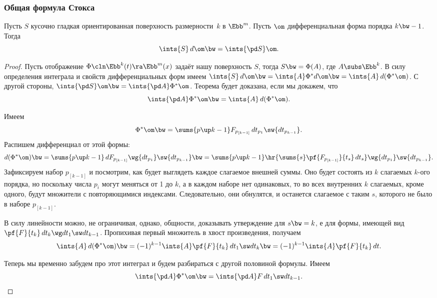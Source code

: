 \documentclass[a4paper]{article}
\newcommand{\pv}[1]{{p_{[#1]}}}
\newcommand{\di}[3]{{d {#1}_{#2_{#3}}}}
\begin{document}
\subsubsection{Общая формула Стокса}

\begin{theorem}
Пусть $S$ кусочно гладкая ориентированная поверхность размерности~$k$ в $\Ebb^m$. Пусть $\om$ дифференциальная форма
порядка $k\bw-1$. Тогда
$$\ints{S}\,d \om \bw= \ints{\pd S} \om.$$
\end{theorem}
\begin{proof}
Пусть отображение $\Phi\cln \Ebb^k(t) \ra \Ebb^m(x)$ задаёт нашу поверхность $S$, тогда $S \bw= \Phi(A)$, где
$A \subs \Ebb^k$. В силу определения интеграла и свойств дифференциальных форм имеем $\ints{S}\,d \om \bw=
\ints{A}\Phi^*d \om \bw= \ints{A}\,d(\Phi^*\om)$. С другой стороны, $\ints{\pd S}\om \bw= \ints{\pd A}
\Phi^*\om$. Теорема будет доказана, если мы докажем, что
$$\ints{\pd A} \Phi^*\om \bw= \ints{A}\,d(\Phi^*\om).$$

Имеем
$$\Phi^*\om \bw= \sums{p\up k-1} F_{\pv{k-1}} \,\di tp1\sw \di tp{k-1}.$$
Распишем дифференциал от этой формы:
$$
d(\Phi^*\om) \bw= \sums{p\up k-1} \,d F_{\pv{k-1}} \wg \di tp1\sw \di tp{k-1}\bw= \sums{p\up k-1}
\hr{\sums{s}\pf{F_{\pv{k-1}}}{t_s}\,d t_s} \wg \di tp1\sw \di tp{k-1}.
$$
Зафиксируем набор $\pv{k-1}$ и посмотрим, как будет выглядеть каждое слагаемое внешней суммы.
Оно будет состоять из $k$ слагаемых $k$-ого порядка, но поскольку числа $p_i$ могут меняться от 1 до $k$,
а в каждом наборе нет одинаковых, то во всех внутренних $k$ слагаемых, кроме одного, будут множители с
повторяющимися индексами. Следовательно, они обнулятся,
и останется слагаемое с таким $s$, которого не было в наборе $\pv{k-1}$.

В силу линейности можно, не ограничивая, однако, общности, доказывать утверждение для $s \bw= k$, е для
формы, имеющей вид $\pf{F}{t_k}\,d t_k \wg dt_1 \sw dt_{k-1}$. Пропихивая первый множитель в хвост
произведения, получаем
$$
  \ints{A}\,d(\Phi^*\om) \bw= (-1)^{k-1}\ints{A}\pf{F}{t_k} \,d t_1 \sw d t_k \bw=
  (-1)^{k-1}\ints{A} \pf{F}{t_k} \,d t.
$$

Теперь мы временно забудем про этот интеграл и будем разбираться с другой половиной формулы. Имеем
$$\ints{\pd A}\Phi^*\om \bw= \ints{\pd A}F\,d t_1\sw d t_{k-1}.$$


\end{proof}
\end{document}
